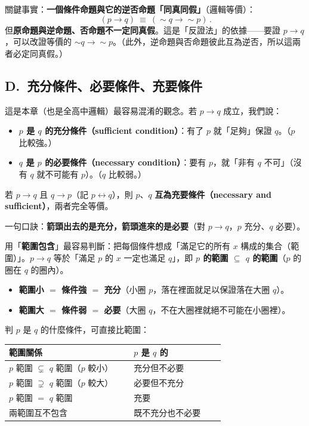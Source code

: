\documentclass[11pt]{article}
\begin{document}
關鍵事實：\textbf{一個條件命題與它的逆否命題「同真同假」}（邏輯等價）：
$$
\boxed{\,(p\to q)\ \equiv\ (\sim q\to\sim p)\,}.
$$
但\textbf{原命題與逆命題、否命題不一定同真假}。這是「反證法」的依據——要證 $p\to q$，可以改證等價的 $\sim q\to\sim p$。（此外，逆命題與否命題彼此互為逆否，所以這兩者必定同真假。）

\subsection*{\sffamily D.\ 充分條件、必要條件、充要條件}

這是本章（也是全高中邏輯）最容易混淆的觀念。若 $p\to q$ 成立，我們說：

\begin{itemize}\setlength{\itemsep}{2pt}
\item \textbf{$p$ 是 $q$ 的充分條件（sufficient condition）}：有了 $p$ 就「足夠」保證 $q$。（$p$ 比較強。）
\item \textbf{$q$ 是 $p$ 的必要條件（necessary condition）}：要有 $p$，就「非有 $q$ 不可」（沒有 $q$ 就不可能有 $p$）。（$q$ 比較弱。）
\end{itemize}
若 $p\to q$ 且 $q\to p$（記 $p\leftrightarrow q$），則 $p$、$q$ \textbf{互為充要條件（necessary and sufficient）}，兩者完全等價。

一句口訣：\textbf{箭頭出去的是充分，箭頭進來的是必要}（對 $p\to q$，$p$ 充分、$q$ 必要）。

用「\textbf{範圍包含}」最容易判斷：把每個條件想成「滿足它的所有 $x$ 構成的集合（範圍）」。$p\to q$ 等於「滿足 $p$ 的 $x$ 一定也滿足 $q$」，即 \textbf{$p$ 的範圍 $\subseteq$ $q$ 的範圍}（$p$ 的圈在 $q$ 的圈內）。


\begin{itemize}\setlength{\itemsep}{1pt}
\item \textbf{範圍小 $=$ 條件強 $=$ 充分}（小圈 $p$，落在裡面就足以保證落在大圈 $q$）。
\item \textbf{範圍大 $=$ 條件弱 $=$ 必要}（大圈 $q$，不在大圈裡就絕不可能在小圈裡）。
\end{itemize}

判 $p$ 是 $q$ 的什麼條件，可直接比範圍：

\begin{center}
\renewcommand{\arraystretch}{1.35}
\begin{tabular}{p{0.52\linewidth} p{0.38\linewidth}}
\hline
\textbf{範圍關係} & \textbf{$p$ 是 $q$ 的} \\
\hline
$p$ 範圍 $\subsetneq$ $q$ 範圍（$p$ 較小） & 充分但不必要 \\
$p$ 範圍 $\supsetneq$ $q$ 範圍（$p$ 較大） & 必要但不充分 \\
$p$ 範圍 $=$ $q$ 範圍 & 充要 \\
兩範圍互不包含 & 既不充分也不必要 \\
\hline
\end{tabular}
\end{center}
\end{document}

